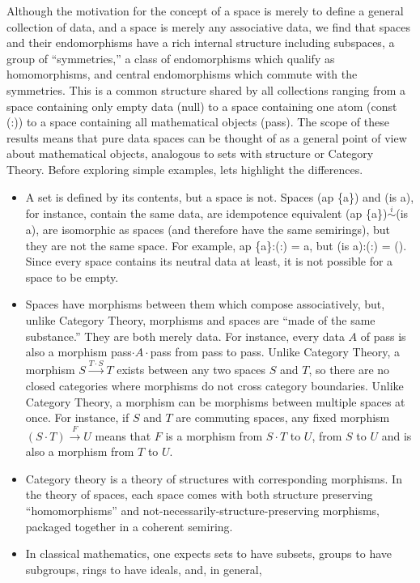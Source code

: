 \documentclass[11pt]{article}
\begin{document}
Although the motivation for the concept of a space is merely to define a general collection of data, and a space is merely any associative data, we 
find that spaces and their endomorphisms have a rich internal structure including subspaces, a group of ``symmetries,'' a class of endomorphisms which 
qualify as homomorphisms, and central endomorphisms which commute with the symmetries.  This is a common structure shared by all collections ranging 
from a space containing only empty data (null) to a space containing one atom (const (:)) to a space containing all mathematical objects (pass).  
The scope of these results means that pure data spaces can be thought of as a general point of view about mathematical objects, analogous to
sets with structure or Category Theory.  Before exploring simple examples, lets highlight the differences. 
\begin{itemize}
\item{A set is defined by its contents, but a space is not.  Spaces (ap \{a\}) and (is a), for instance, contain the 
same data, are idempotence equivalent (ap \{a\})${\overset i\sim}$(is a), are isomorphic as spaces (and therefore have 
the same semirings), but they are not the same space.  For example, ap \{a\}:(:) = a, but (is a):(:) = ().  Since every 
space contains its neutral data at least, it is not possible for a space to be empty.}
\item{Spaces have morphisms between them which compose associatively, but, unlike Category Theory, morphisms 
and spaces are ``made of the same substance.'' They are both merely data.  For instance, every data $A$ of pass is also 
a morphism pass$\cdot A\cdot$pass from pass to pass.  Unlike Category Theory, a morphism 
$S{\overset {T\cdot S}\longrightarrow}T$ exists between any two spaces $S$ and $T$, so there are no closed categories 
where morphisms do not cross category boundaries.  Unlike Category Theory, a morphism can be morphisms between 
multiple spaces at once.  For instance, if $S$ and $T$ are commuting spaces, any fixed morphism $(S\cdot T){\overset F\rightarrow} U$ 
means that $F$ is a morphism from $S\cdot T$ to $U$, from $S$ to $U$ and is also a morphism from $T$ to $U$.}
\item{Category theory is a theory of structures with corresponding morphisms.  In the theory of spaces, each space 
comes with both structure preserving ``homomorphisms'' and not-necessarily-structure-preserving morphisms, packaged together 
in a coherent semiring.} 
\item{In classical mathematics, one expects sets to have subsets, groups to have subgroups, rings to have ideals, and, in general, 
}
\end{itemize}
\end{document}
